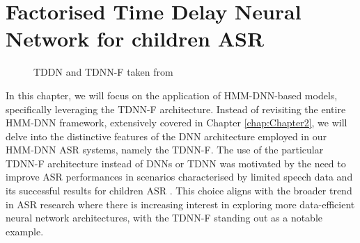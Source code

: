 \section{Factorised Time Delay Neural Network for children ASR}
\label{sec:TDNNF}
\begin{figure}[h]
    \centering
    \caption{TDDN and TDNN-F taken from \cite{tdnnf-children}}
\end{figure}
In this chapter, we will focus on the application of \ac{HMM-DNN}-based models, specifically leveraging the \ac{TDNN-F} architecture.  Instead of revisiting the entire \ac{HMM-DNN} framework, extensively covered in Chapter \ref{chap:Chapter2}, we will delve into the distinctive features of the \ac{DNN} architecture employed in our \ac{HMM-DNN} \ac{ASR} systems, namely the \ac{TDNN-F}. 
The use of the particular \ac{TDNN-F} architecture instead of \acp{DNN} or \ac{TDNN} was motivated by the need to improve \ac{ASR} performances in scenarios characterised by limited speech data and its successful results for children \ac{ASR} \cite{tdnnf-children}. This choice aligns with the broader trend in \ac{ASR} research where there is increasing interest in exploring more data-efficient neural network architectures, with the \ac{TDNN-F} standing out as a notable example.

